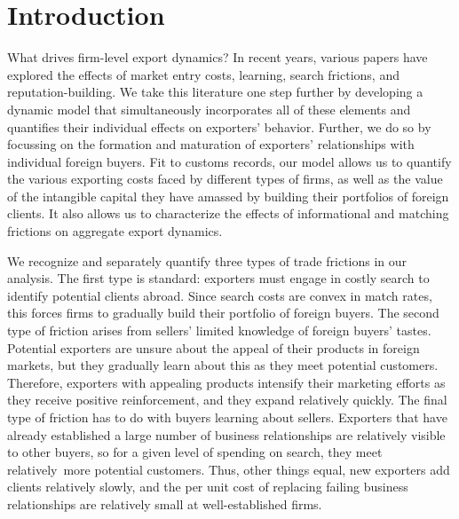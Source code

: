 \documentclass[12pt]{article}
\begin{document}


\thispagestyle{empty}


\newpage

\section{Introduction}

What drives firm-level export dynamics? In recent years, various papers have explored the effects of market entry costs, learning, search frictions, and reputation-building. We take this literature one step further by developing a dynamic model that simultaneously incorporates all of these elements and quantifies their individual effects on exporters' behavior. Further, we do so by focussing on the formation and maturation of exporters' relationships with individual foreign buyers. Fit to customs records, our model allows us to quantify the various exporting costs faced by different types of firms, as well as the value of the intangible capital they have amassed by building their portfolios of foreign clients. It also allows us to characterize the effects of informational and matching frictions on aggregate export dynamics.

We recognize and separately quantify three types
of trade frictions in our analysis. The first type is standard: exporters must engage in
costly search to identify potential clients abroad. Since search costs are
convex in match rates, this forces firms to gradually build their portfolio
of foreign buyers. The second type of friction arises from sellers' limited
knowledge of foreign buyers' tastes. Potential exporters are unsure about
the appeal of their products in foreign markets, but they gradually learn
about this as they meet potential customers. Therefore, exporters with
appealing products intensify their marketing efforts as they receive
positive reinforcement, and they expand relatively quickly. The final type
of friction has to do with buyers learning about sellers. Exporters that
have already established a large number of business relationships are
relatively visible to other buyers, so for a given level of spending on
search, they meet relatively\ more potential customers. Thus, other things equal, new exporters add clients relatively slowly, and the per unit cost of replacing failing
business relationships are relatively small at well-established firms.
\end{document}

